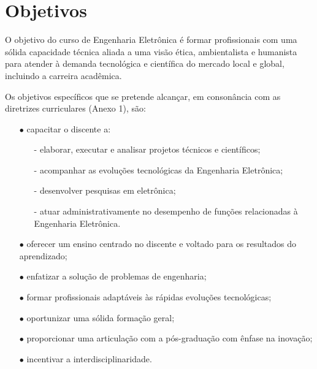 \chapter{Objetivos}
\label{cap4}

O objetivo do curso de Engenharia Eletrônica é formar profissionais com uma sólida capacidade técnica aliada a uma visão ética, ambientalista e humanista para atender à demanda tecnológica e científica do mercado local e global, incluindo a carreira acadêmica. 

Os objetivos específicos que se pretende alcançar, em consonância com as diretrizes curriculares (Anexo 1), são:
\begin{enumerate}
	\item[$\bullet$]capacitar o discente a:
\begin{itemize}
	\item[-] elaborar, executar e analisar projetos técnicos e científicos;
	\item[-]acompanhar as evoluções tecnológicas da Engenharia Eletrônica;
	\item[-]desenvolver pesquisas em eletrônica;
	\item[-]atuar administrativamente no desempenho de funções relacionadas à Engenharia Eletrônica.
\end{itemize}
	\item[$\bullet$]oferecer um ensino centrado no discente e voltado para os resultados do aprendizado;
	\item[$\bullet$]enfatizar a solução de problemas de engenharia;
	\item[$\bullet$]formar profissionais adaptáveis às rápidas evoluções tecnológicas;
	\item[$\bullet$]oportunizar uma sólida formação geral;
	\item[$\bullet$]proporcionar uma articulação com a pós-graduação com ênfase na inovação;
	\item[$\bullet$]incentivar a interdisciplinaridade.
\end{enumerate}
